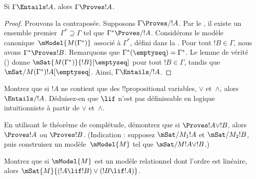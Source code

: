 \documentclass[../../../include/open-logic-section]{subfiles}
\begin{document}


\begin{thm}
  Si $\Gamma \Entails !A$, alors $\Gamma \Proves !A$.
\end{thm}

\begin{proof}
  Prouvons la contraposée. Supposons $\Gamma \Proves/ !A$. Par le
  , il existe un ensemble premier~$\Gamma^*
  \supseteq \Gamma$ tel que $\Gamma^* \Proves/ !A$. Considérons le
  modèle canonique~$\mModel{M(\Gamma^*)}$ associé à $\Gamma^*$, défini
  dans la . Pour tout $!B \in \Gamma$,
  nous avons $\Gamma^* \Proves !B$. Remarquons que
  $\Gamma^*(\emptyseq) = \Gamma^*$. Le lemme de vérité
  () donne
  $\mSat{M(\Gamma^*)}{!B}[\emptyseq]$ pour tout $!B \in \Gamma$,
  tandis que $\mSat/{M(\Gamma^*)}{!A}[\emptyseq]$. Ainsi,
  $\Gamma \Entails/ !A$.
\end{proof}

\begin{prob}
  Montrez que si $!A$ ne contient que des !!{propositional variable}s,
  $\lor$ et~$\land$, alors $\Entails/ !A$. Déduisez-en que $\lif$
  n'est pas définissable en logique intuitionniste à partir de $\lor$
  et~$\land$.
\end{prob}

\begin{prob}
  En utilisant le théorème de complétude, démontrez que si
  $\Proves !A \lor !B$, alors $\Proves !A$ ou $\Proves !B$.
  (Indication : supposez $\mSat/{M_1}{!A}$ et
  $\mSat/{M_2}{!B}$, puis construisez un modèle~$\mModel{M}$ tel que
  $\mSat/{M}{!A \lor !B}$.)
\end{prob}

\begin{prob}
  Montrez que si $\mModel{M}$ est un modèle relationnel dont l'ordre
  est linéaire, alors $\mSat{M}{(!A \lif !B)\lor(!B \lif !A)}$.
\end{prob}
\end{document}
